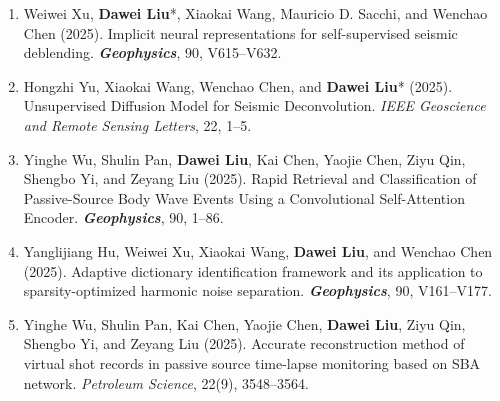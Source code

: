 \documentclass[11pt,a4paper]{article}
\begin{document}
\begin{enumerate}[leftmargin=1.5em, itemsep=0pt, topsep=2pt]
    \item Weiwei Xu, \textbf{Dawei Liu}*, Xiaokai Wang, Mauricio D. Sacchi, and Wenchao Chen (2025). Implicit neural representations for self-supervised seismic deblending. \textit{\textbf{Geophysics}}, 90, V615--V632.
    \item Hongzhi Yu, Xiaokai Wang, Wenchao Chen, and \textbf{Dawei Liu}* (2025). Unsupervised Diffusion Model for Seismic Deconvolution. \textit{IEEE Geoscience and Remote Sensing Letters}, 22, 1--5.
    \item Yinghe Wu, Shulin Pan, \textbf{Dawei Liu}, Kai Chen, Yaojie Chen, Ziyu Qin, Shengbo Yi, and Zeyang Liu (2025). Rapid Retrieval and Classification of Passive-Source Body Wave Events Using a Convolutional Self-Attention Encoder. \textit{\textbf{Geophysics}}, 90, 1--86.
    \item Yanglijiang Hu, Weiwei Xu, Xiaokai Wang, \textbf{Dawei Liu}, and Wenchao Chen (2025). Adaptive dictionary identification framework and its application to sparsity-optimized harmonic noise separation. \textit{\textbf{Geophysics}}, 90, V161--V177.
    \item Yinghe Wu, Shulin Pan, Kai Chen, Yaojie Chen, \textbf{Dawei Liu}, Ziyu Qin, Shengbo Yi, and Zeyang Liu (2025). Accurate reconstruction method of virtual shot records in passive source time-lapse monitoring based on SBA network. \textit{Petroleum Science}, 22(9), 3548--3564. 
    

\end{enumerate}
\end{document}
